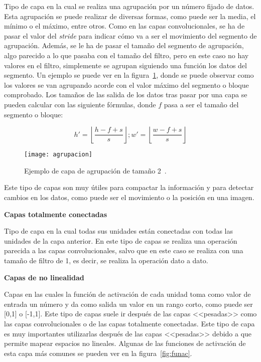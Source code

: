 Tipo de capa en la cual se realiza una agrupación por un número fijado de datos. Esta agrupación se puede realizar de diversas formas, como puede ser la media, el mínimo o el máximo, entre otros. Como en las capas convolucionales, se ha de pasar el valor del \textit{stride} para indicar cómo va a ser el movimiento del segmento de agrupación. Además, se le ha de pasar el tamaño del segmento de agrupación, algo parecido a lo que pasaba con el tamaño del filtro, pero en este caso no hay valores en el filtro, simplemente se agrupan siguiendo una función los datos del segmento. Un ejemplo se puede ver en la figura~\ref{fig:agrupacion}, donde se puede observar como los valores se van agrupando acorde con el valor máximo del segmento o bloque comprobado. Los tamaños de las salida de los datos tras pasar por una capa se pueden calcular con las siguiente fórmulas, donde $f$ pasa a ser el tamaño del segmento o bloque:

\begin{equation}
h'=\left \lfloor \frac{h-f+s}{s} \right \rfloor;w'=\left \lfloor \frac{w-f+s}{s} \right \rfloor
\end{equation}

\begin{figure}[h]
	\centering
	\texttt{[image: agrupacion]}
	\caption[Ejemplo de capa de agrupación de tamaño 2.]{Ejemplo de capa de agrupación de tamaño 2~\cite{cnn}.}
	\label{fig:agrupacion}
\end{figure}

Este tipo de capas son muy útiles para compactar la información y para detectar cambios en los datos, como puede ser el movimiento o la posición en una imagen.

\textbf{Capas totalmente conectadas}

Tipo de capa en la cual todas sus unidades están conectadas con todas las unidades de la capa anterior. En este tipo de capas se realiza una operación parecida a las capas convolucionales, salvo que en este caso se realiza con una tamaño de filtro de 1, es decir, se realiza la operación dato a dato. 

\textbf{Capas de no linealidad}

Capas en las cuales la función de activación de cada unidad toma como valor de entrada un número y da como salida un valor en un rango corto, como puede ser [0,1] o [-1,1]. Este tipo de capas suele ir después de las capas <<pesadas>> como las capas convolucionales o de las capas totalmente conectadas. Este tipo de capa es muy importantes utilizarlas después de las capas <<pesadas>> debido a que permite mapear espacios no lineales. Algunas de las funciones de activación de esta capa más comunes se pueden ver en la figura~\ref{fig:funac}.

